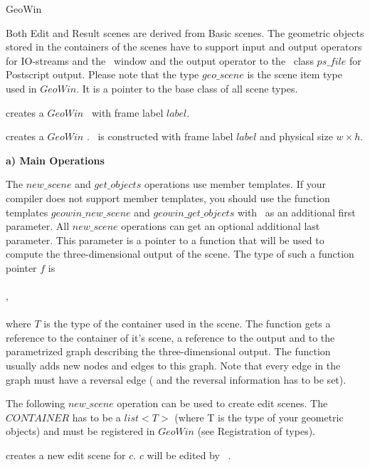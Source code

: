 \begin{ccRefClass}{GeoWin}
\begin{enumerate}
    \end{enumerate}

Both Edit and Result scenes are derived from Basic scenes.
The geometric objects stored in the containers of the scenes have to support input and
output operators for IO-streams and the \leda\ window and the output operator to the \leda\ class 
$ps\_file$ for Postscript output.    
Please note that the type $geo\_scene$ is the scene item type used in $GeoWin$.
It is a pointer to the base class of all scene types.
    
 
\ccCreation

{creates a $GeoWin$ \ccVar\ with  frame label $label$.}

{creates a $GeoWin$ \ccVar.  \ccVar\ is constructed with 
frame label $label$ and physical size $w\times h$. }

\ccOperations


\medskip
{\bf a) Main Operations} 

The $new\_scene$ and $get\_objects$ operations use member templates. If your 
compiler does not support member templates, you should use 
the function templates $geowin\_new\_scene$ and $geowin\_get\_objects$ with
\ccVar\ as an additional first parameter.
All $new\_scene$ operations can get an optional additional last parameter.
This parameter is a pointer to a function that will be used to compute the
three-dimensional output of the scene.
The type of such a function pointer $f$ is \\
\\
,\\
\\
where $T$ is the type of the container used in the scene.
The function gets a reference to the container of it's scene, a reference to the
output  and to the parametrized graph describing the three-dimensional
output. The function usually adds new nodes and edges to this graph. Note that
every edge in the graph must have a reversal edge ( and the reversal information
has to be set).
    
The following $new\_scene$ operation can be used to create edit scenes.
The $CONTAINER$ has to be a $list<T>$ (where T is the type of your geometric
objects) and must be registered in $GeoWin$ (see Registration of types).

{creates a new edit scene for $c$. $c$ will be edited by \ccVar\ . }


\end{ccRefClass}
